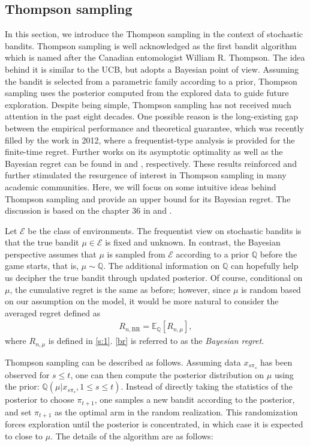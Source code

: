 \documentclass[10pt,a4article]{article}
\numberwithin{equation}{section}
\theoremstyle{plain}
\theoremstyle{definition}
\def\Q{{\mathbb Q}}
\def\E{{\mathbb E}}
\def\BR{{\text{BR}}}
\begin{document}
\subsection{Thompson sampling}   

In this section, we introduce the Thompson sampling in the context of stochastic bandits. Thompson sampling \cite{Thompson_1933} is well acknowledged as the first bandit algorithm which is named after the Canadian entomologist William R. Thompson. 
The idea behind it is similar to the UCB, but adopts a Bayesian point of view. Assuming the bandit is selected from a parametric family according to a prior, Thompson sampling uses the posterior computed from the explored data to guide future exploration. 
Despite being simple, Thompson sampling has not received much attention in the past eight decades. One possible reason is the long-existing gap between the empirical performance and theoretical guarantee, which was recently filled by the work \cite{agrawal2012analysis} in 2012, where a frequentist-type analysis is provided for the finite-time regret.  Further works on its asymptotic optimality as well as the Bayesian regret can be found in \cite{Kaufmann_2012} and \cite{Russo_2014}, respectively. These results reinforced and further stimulated the resurgence of interest in Thompson sampling in many academic communities. Here, we will focus on some intuitive ideas behind Thompson sampling and provide an upper bound for its Bayesian regret. The discussion is based on the chapter 36 in \cite{lattimore2018bandit} and \cite{Russo_2014}. 

Let $\mathcal E$ be the class of environments. The frequentist view on stochastic bandits is that the true bandit $\mu\in\mathcal E$ is fixed and unknown. In contrast, the Bayesian perspective assumes that $\mu$ is sampled from $\mathcal E$ according to a prior $\Q$ before the game starts, that is, $\mu\sim\Q$. The additional information on $\Q$ can hopefully help us decipher the true bandit through updated posterior. Of course, conditional on $\mu$, the cumulative regret is the same as before; however, since $\mu$ is random based on our assumption on the model, it would be more natural to consider the averaged regret defined as
\begin{align}
R_{n, \BR}=\E_\Q[R_{n,\mu}],\label{br}
\end{align}
where $R_{n,\mu}$ is defined in \eqref{s:1}. \eqref{br} is referred to as the \emph{Bayesian regret}. 

Thompson sampling can be described as follows. Assuming data $x_{s\pi_s}$ has been observed for $s\leq t$, one can then compute the posterior distribution on $\mu$ using the prior: $\Q(\mu|x_{s\pi_s}, 1\leq s\leq t)$. Instead of directly taking the statistics of the posterior to choose $\pi_{t+1}$, one samples a new bandit according to the posterior, and set $\pi_{t+1}$ as the optimal arm in the random realization. This randomization forces exploration until the posterior is concentrated, in which case it is expected to close to $\mu$. The details of the algorithm are as follows:
\end{document}
